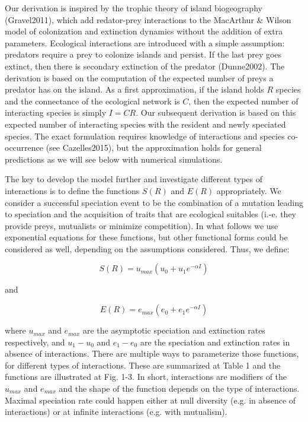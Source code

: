 \documentclass[12pt]{article}
\begin{document}
Our derivation is inspired by the trophic theory of island biogeography
(Gravel2011), which add redator-prey interactions to the MacArthur \& Wilson
model of colonization and extinction dynamics without the addition of extra
parameters. Ecological interactions are introduced with a simple assumption:
predators require a prey to colonize islands and persist. If the last prey
goes extinct, then there is secondary extinction of the predator (Dunne2002).
The derivation is based on the computation of the expected number of preys a
predator has on the island. As a first approximation, if the island holds $R$
species and the connectance of the ecological network is $C$, then the
expected number of interacting species is simply $I = CR$. Our subsequent
derivation is based on this expected number of interacting species with the
resident and newly speciated species. The exact formulation requires knowledge
of interactions and species co-occurrence (see Cazelles2015), but the
approximation holds for general predictions as we will see below with
numerical simulations.

The key to develop the model further and investigate different types of
interactions is to define the functions $S(R)$ and $E(R)$ appropriately.   We
consider a successful speciation event to be the combination of a mutation
leading to speciation and the acquisition of traits that are ecological
suitables (i.-e. they provide preys, mutualists or minimize competition). In
what follows we use exponential equations for these functions, but other
functional forms could be considered as well, depending on the assumptions
considered. Thus, we define:

\begin{equation}
	S(R) = u_{max}(u_0 + u_1 e^{-\alpha I})
\end{equation}

and 

\begin{equation}
	E(R) = e_{max}(e_0 + e_1 e^{-\alpha I})
\end{equation}


where $u_{max}$ and $e_{max}$ are the asymptotic speciation and extinction
rates respectively, and $u_1-u_0$ and $e_1-e_0$ are the speciation and
extinction rates in absence of interactions. There are multiple ways to
parameterize those functions, for different types of interactions. These are
summarized at Table 1 and the functions are illustrated at Fig. 1-3. In short,
interactions are modifiers of the $u_{max}$ and $e_{max}$ and the shape of the
function depends on the type of interactions. Maximal speciation rate could
happen either at null diversity (e.g. in absence of interactions) or at
infinite interactions (e.g. with mutualism).
\end{document}
